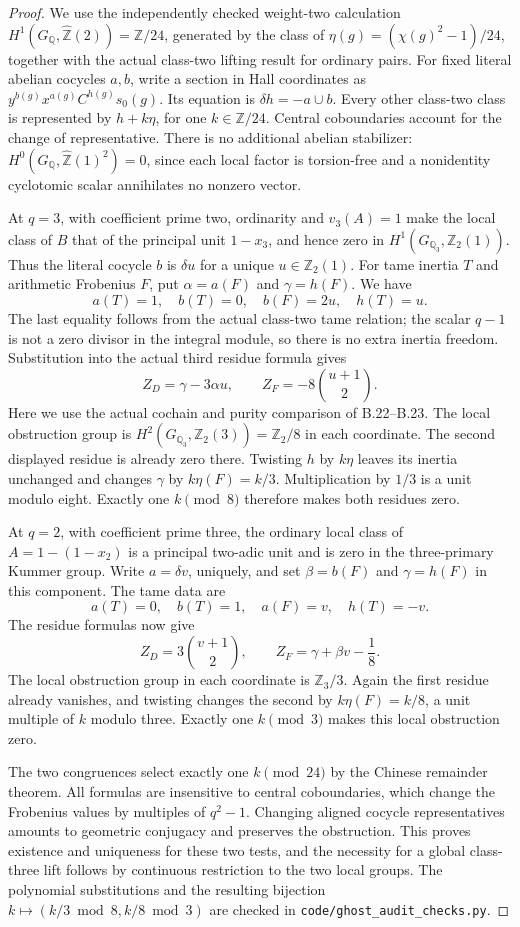 \begin{proof}
We use the independently checked weight-two calculation
$H^1(G_{\mathbb Q},\widehat{\mathbb Z}(2))=\mathbb Z/24$, generated
by the class of $\eta(g)=(\chi(g)^2-1)/24$, together with the actual
class-two lifting result for ordinary pairs. For fixed literal abelian
cocycles $a,b$, write a section in Hall coordinates as
$y^{b(g)}x^{a(g)}C^{h(g)}s_0(g)$. Its equation is
$\delta h=-a\cup b$. Every other class-two class is represented by
$h+k\eta$, for one $k\in\mathbb Z/24$. Central coboundaries account
for the change of representative. There is no additional abelian
stabilizer: $H^0(G_{\mathbb Q},\widehat{\mathbb Z}(1)^2)=0$,
since each local factor is torsion-free and a nonidentity cyclotomic
scalar annihilates no nonzero vector.

At $q=3$, with coefficient prime two, ordinarity and $v_3(A)=1$
make the local class of $B$ that of the principal unit $1-x_3$,
and hence zero in $H^1(G_{\mathbb Q_3},\mathbb Z_2(1))$.
Thus the literal cocycle $b$ is $\delta u$ for a unique
$u\in\mathbb Z_2(1)$. For tame inertia $T$ and arithmetic Frobenius
$F$, put $\alpha=a(F)$ and $\gamma=h(F)$. We have
\[
a(T)=1,\quad b(T)=0,\quad b(F)=2u,\quad h(T)=u.
\]
The last equality follows from the actual class-two tame relation;
the scalar $q-1$ is not a zero divisor in the integral module, so
there is no extra inertia freedom. Substitution into the actual third
residue formula gives
\[
Z_D=\gamma-3\alpha u,\qquad
Z_F=-8\binom{u+1}{2}.
\]
Here we use the actual cochain and purity comparison of B.22--B.23.
The local obstruction group is
$H^2(G_{\mathbb Q_3},\mathbb Z_2(3))=\mathbb Z_2/8$ in each
coordinate. The second displayed residue is already zero there.
Twisting $h$ by $k\eta$ leaves its inertia unchanged and changes
$\gamma$ by $k\eta(F)=k/3$. Multiplication by $1/3$ is a unit
modulo eight. Exactly one $k\pmod8$ therefore makes both residues
zero.

At $q=2$, with coefficient prime three, the ordinary local class of
$A=1-(1-x_2)$ is a principal two-adic unit and is zero in the
three-primary Kummer group. Write $a=\delta v$, uniquely, and set
$\beta=b(F)$ and $\gamma=h(F)$ in this component. The tame data are
\[
a(T)=0,\quad b(T)=1,\quad a(F)=v,\quad h(T)=-v.
\]
The residue formulas now give
\[
Z_D=3\binom{v+1}{2},\qquad
Z_F=\gamma+\beta v-\frac18.
\]
The local obstruction group in each coordinate is $\mathbb Z_3/3$.
Again the first residue already vanishes, and twisting changes the
second by $k\eta(F)=k/8$, a unit multiple of $k$ modulo three.
Exactly one $k\pmod3$ makes this local obstruction zero.

The two congruences select exactly one $k\pmod{24}$ by the Chinese
remainder theorem. All formulas are insensitive to central coboundaries,
which change the Frobenius values by multiples of $q^2-1$.
Changing aligned cocycle representatives amounts to geometric
conjugacy and preserves the obstruction. This proves existence and
uniqueness for these two tests, and the necessity for a global
class-three lift follows by continuous restriction to the two local
groups. The polynomial substitutions and the resulting bijection
$k\mapsto(k/3\bmod8,k/8\bmod3)$ are checked in
\texttt{code/ghost\_audit\_checks.py}.
\end{proof}


